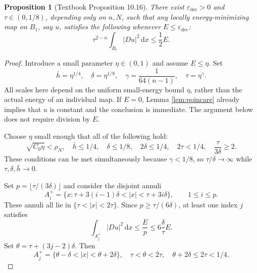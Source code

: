 \documentclass[11pt,a4paper]{article}
\numberwithin{equation}{section}
\newtheorem{proposition}[theorem]{Proposition}
\theoremstyle{definition}
\newcommand{\dd}{\,\mathrm d}
\newcommand{\dx}{\dd x}
\begin{document}
\begin{proposition}[Textbook Proposition 10.16]\label{prop:decay}
There exist $\varepsilon_{\mathrm{dec}}>0$ and $\tau\in(0,1/8)$, depending only on $n,N$, such that any locally energy-minimizing map on $B_1$, say $u$, satisfies the following whenever $E\le\varepsilon_{\mathrm{dec}}$:
\begin{equation}\label{eq:one-step}
\tau^{2-n}\int_{B_\tau}|Du|^2\dx\le\frac12 E.
\end{equation}
\end{proposition}
\begin{proof}
Introduce a small parameter $\eta\in(0,1)$ and assume $E\le\eta$. Set
\begin{equation}\label{eq:parameters}
\bar h=\eta^{1/4},\quad\delta=\eta^{1/8},\quad
\gamma=\frac1{64(n-1)},\quad\tau=\eta^\gamma.
\end{equation}
All scales here depend on the uniform small-energy bound $\eta$, rather than the actual energy of an individual map. If $E=0$, Lemma \ref{lem:poincare} already implies that $u$ is constant and the conclusion is immediate. The argument below does not require division by $E$.

Choose $\eta$ small enough that all of the following hold:
\begin{equation}\label{eq:geometric-smallness}
\sqrt{C_0\eta}<\rho_N,\quad\bar h\le1/4,\quad
\delta\le1/8,\quad2\delta\le1/4,\quad
2\tau<1/4,\quad\frac{\tau}{3\delta}\ge2.
\end{equation}
These conditions can be met simultaneously because $\gamma<1/8$, so $\tau/\delta\to\infty$ while $\tau,\delta,\bar h\to0$.

Set $p=\lfloor\tau/(3\delta)\rfloor$ and consider the disjoint annuli
\[
A_i^+=\{x:\tau+3(i-1)\delta<|x|<\tau+3i\delta\},
\qquad1\le i\le p.
\]
These annuli all lie in $\{\tau<|x|<2\tau\}$. Since $p\ge\tau/(6\delta)$, at least one index $j$ satisfies
\begin{equation}\label{eq:good-shell}
\int_{A_j^+}|Du|^2\dx\le\frac Ep\le6\frac\delta\tau E.
\end{equation}
Set $\theta=\tau+(3j-2)\delta$. Then
\[
A_j^+=\{\theta-\delta<|x|<\theta+2\delta\},\quad
\tau<\theta<2\tau,\quad\theta+2\delta\le2\tau<1/4.
\]


\end{proof}
\end{document}
